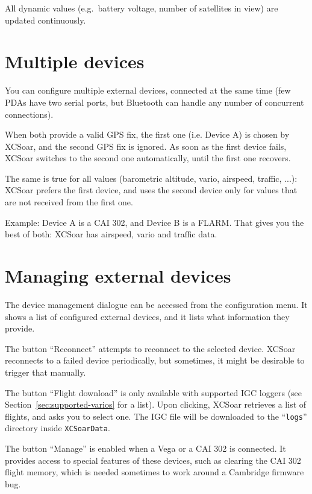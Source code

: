 All dynamic values (e.g.\ battery voltage, number of satellites in
view) are updated continuously.

\section{Multiple devices}

You can configure multiple external devices, connected at the same
time (few PDAs have two serial ports, but Bluetooth can handle any
number of concurrent connections).

When both provide a valid GPS fix, the first one (i.e. Device A) is chosen by
XCSoar, and the second GPS fix is ignored.  As soon as the first device fails,
XCSoar switches to the second one automatically, until the first one recovers.

The same is true for all values (barometric altitude, vario, airspeed,
traffic, ...): XCSoar prefers the first device, and uses the second
device only for values that are not received from the first one.

Example: Device A is a CAI 302, and Device B is a FLARM.
That gives you the best of both: XCSoar has airspeed, vario and
traffic data.


\section{Managing external devices}

The device management dialogue can be accessed from the configuration
menu. It shows a list of configured external devices,
and it lists what information they provide.

The button ``Reconnect'' attempts to reconnect to the selected
device.  XCSoar reconnects to a failed device periodically, but
sometimes, it might be desirable to trigger that manually.

The button ``Flight download'' is only available with supported IGC
loggers (see Section~\ref{sec:supported-varios} for a list).  Upon clicking,
XCSoar retrieves a list of flights, and asks you to select one.  The
IGC file will be downloaded to the ``\texttt{logs}'' directory inside
\texttt{XCSoarData}.

The button ``Manage'' is enabled when a Vega or a CAI 302 is
connected.  It provides access to special features of these devices,
such as clearing the CAI 302 flight memory, which is needed sometimes
to work around a Cambridge firmware bug.
